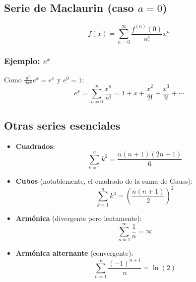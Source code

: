 \documentclass[letterpaper, 12pt]{article}
\begin{document}
	\subsection{Serie de Maclaurin (caso $a=0$)}
	
	\[
	f(x) = \sum_{n=0}^\infty \frac{f^{(n)}(0)}{n!}x^n
	\]
	
	\subsubsection{Ejemplo: $e^x$}
	
	Como $\frac{d^n}{dx^n}e^x = e^x$ y $e^0 = 1$:
	\[
	e^x = \sum_{n=0}^\infty \frac{x^n}{n!} = 1 + x + \frac{x^2}{2!} + \frac{x^3}{3!} + \cdots
	\]
	
	\subsection{Otras series esenciales}
	
	\begin{itemize}
		\item \textbf{Cuadrados}:
		\[
		\sum_{k=1}^n k^2 = \frac{n(n+1)(2n+1)}{6}
		\]
		
		\item \textbf{Cubos} (notablemente, el cuadrado de la suma de Gauss):
		\[
		\sum_{k=1}^n k^3 = \left( \frac{n(n+1)}{2} \right)^2
		\]
	\end{itemize}
	
	\begin{itemize}
		\item \textbf{Armónica} (divergente pero lentamente):
		\[
		\sum_{n=1}^\infty \frac{1}{n} = \infty
		\]
		
		\item \textbf{Armónica alternante} (convergente):
		\[
		\sum_{n=1}^\infty \frac{(-1)^{n+1}}{n} = \ln(2)
		\]
	\end{itemize}	
	
\end{document}

